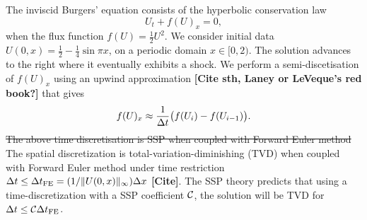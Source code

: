 The inviscid Burgers' equation consists of the hyperbolic conservation law
\begin{equation}\label{eq:HCL}
    U_{t} + f(U)_{x} = 0,
\end{equation}
when the flux function $f(U) = \frac{1}{2}U^{2}$. 
We consider initial data
    $U(0,x)  = \frac{1}{2} - \frac{1}{4}\sin{\pi x}$,
on a periodic domain $x \in [0,2)$.
The solution advances to the right where it eventually exhibits a shock. 
We perform a semi-discetisation of $f(U)_{x}$ using an upwind approximation 
\textbf{[Cite sth, Laney or LeVeque's red book?]}
 that gives
\begin{equation}\label{eq:burgers_flux}
    f(U)_{x} \approx \frac{1}{\Delta t}\bigl(f(U_{i}) - f(U_{i-1})\bigr).
\end{equation}
\sout{
The above time discretisation is SSP when coupled with Forward Euler method
}
The spatial discretization is total-variation-diminishing (TVD) when
coupled with Forward Euler method under time restriction
$\Delta t \leq {\Delta t}_{\text{FE}} = (1 / \|U(0,x)\|_{\infty}) \Delta x$
\textbf{[Cite]}.
The SSP theory predicts that using a time-discretization with a SSP
coefficient $\mathcal{C}$, the solution will be TVD for $\Delta t \leq
\mathcal{C} {\Delta t}_{\text{FE}}$.


